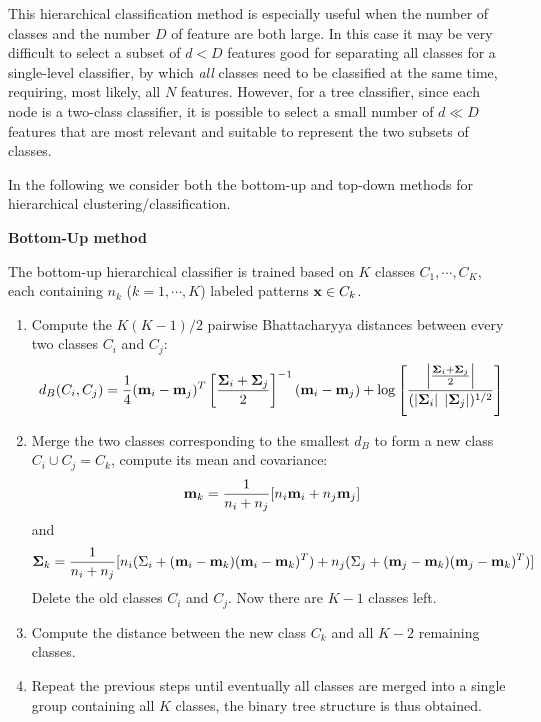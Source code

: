 \documentclass{article}
\begin{document}
\begin{itemize}
  This hierarchical classification method is especially useful when the number 
  of classes and the number $D$ of feature are both large. In this case it may
  be very difficult to select a subset of $d<D$ features good for separating 
  all classes for a single-level classifier, by which {\em all} classes need 
  to be classified at the same time, requiring, most likely, all $N$ features. 
  However, for a tree classifier, since each node is a two-class classifier, 
  it is possible to select a small number of $d\ll D$ features that are most 
  relevant and suitable to represent the two subsets of classes. 

\end{itemize}

In the following we consider both the bottom-up and top-down methods for 
hierarchical clustering/classification.

{\bf Bottom-Up method}

  The bottom-up hierarchical classifier is trained based on $K$ classes 
  $C_1,\cdots,C_K$, each containing $n_k$ ($k=1,\cdots,K$) labeled
  patterns ${\bf x}\in C_k$.

  \begin{enumerate}

  \item Compute the $K(K-1)/2$ pairwise Bhattacharyya distances between
    every two classes $C_i$ and $C_j$:
    \begin{equation} 
    d_B(C_i,C_j)
    =\frac{1}{4}({\bf m}_i-{\bf m}_j)^T\left[\frac{{\bf \Sigma}_i+{\bf \Sigma}_j}{2}\right]^{-1}({\bf m}_i-{\bf m}_j)+\log\left[\frac{\left|\frac{{\bf \Sigma}_i+{\bf \Sigma}_j}{2} 
        \right|}{(\left|{\bf \Sigma}_i\right|\;\left|{\bf \Sigma}_j\right|)^{1/2}}\right]
    \end{equation}
  
  \item Merge the two classes corresponding to the smallest $d_B$ to form 
    a new class $C_i \cup C_j = C_k$, compute its mean and covariance:
    \begin{equation}	
      {\bf m}_k=\frac{1}{n_i+n_j}[n_i {\bf m}_i+n_j {\bf m}_j]	
    \end{equation}
    and
    \begin{equation}
      {\bf \Sigma}_k=\frac{1}{n_i+n_j}
      [n_i (\Sigma_i+({\bf m}_i-{\bf m}_k)({\bf m}_i-{\bf m}_k)^T)+
        n_j (\Sigma_j+({\bf m}_j-{\bf m}_k)({\bf m}_j-{\bf m}_k)^T ) ]
    \end{equation}
    Delete the old classes $C_i$ and $C_j$. Now there are $K-1$ 
    classes left.

  \item Compute the distance between the new class $C_k$ and all $K-2$
    remaining classes.

  \item Repeat the previous steps until eventually all classes are merged 
    into a single group containing all $K$ classes, the binary tree 
    structure is thus obtained.

  \end{enumerate}
  
\end{document}
